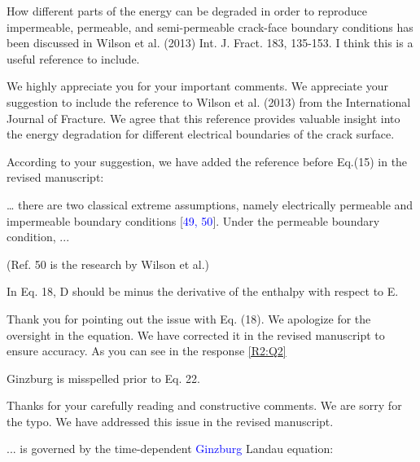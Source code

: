 \documentclass[12pt,fleqn]{article}
\begin{document}
\begin{response}
\end{response}

\begin{question}{}\label{R1:Q2}
How different parts of the energy can be degraded in order to reproduce impermeable, permeable, and semi-permeable crack-face boundary conditions has been discussed in Wilson et al. (2013) Int. J. Fract. 183, 135-153. I think this is a useful reference to include.
\end{question}

\begin{response}
We highly appreciate you for your important comments. We appreciate your suggestion to include the reference to Wilson et al. (2013) from the International Journal of Fracture. We agree that this reference provides valuable insight into the energy degradation for different electrical boundaries of the crack surface. 

According to your suggestion, we have added the reference  before Eq.(15) in the revised manuscript:
\begin{revised}
    … there are two classical extreme assumptions, namely electrically permeable and impermeable boundary conditions [\textcolor{blue}{49, 50}]. Under the permeable boundary condition, ...  
\end{revised}
(Ref. 50 is the research by Wilson et al.)
\end{response}

\begin{question}{}\label{R1:Q3}
In Eq. 18, D should be minus the derivative of the enthalpy with respect to E.
\end{question}
\begin{response}
Thank you for pointing out the issue with Eq. (18). We apologize for the oversight in the equation. We have corrected it in the revised manuscript to ensure accuracy. As you can see in the response \cref{R2:Q2}
\end{response}

\begin{question}{}\label{R1:Q4}
Ginzburg is misspelled prior to Eq. 22.
\end{question}

\begin{response}
Thanks for your carefully reading and constructive comments. We are sorry for the typo. We have addressed this issue in the revised manuscript.
\begin{revised}
... is governed by the time-dependent \textcolor{blue}{Ginzburg} Landau equation:
\end{revised}
\end{response}
\end{document}
